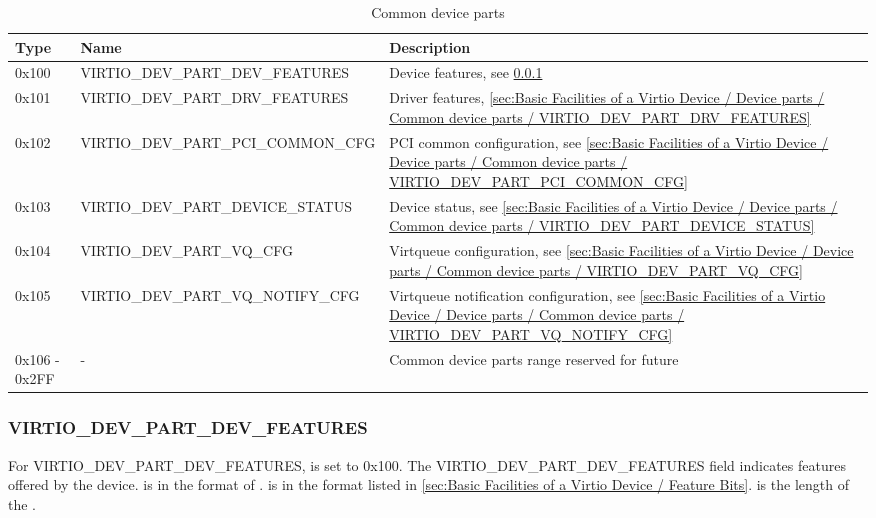 \begin{table}
\caption{Common device parts}
\label{table:Basic Facilities of a Virtio Device / Device parts / Common device parts}
\begin{tabularx}{\textwidth}{ |l||l|X| }
\hline
Type & Name & Description \\
\hline \hline
0x100 & VIRTIO_DEV_PART_DEV_FEATURES & Device features, see \ref{sec:Basic Facilities of a Virtio Device / Device parts / Common device parts / VIRTIO_DEV_PART_DEV_FEATURES} \\
\hline
0x101 & VIRTIO_DEV_PART_DRV_FEATURES & Driver features, \ref{sec:Basic Facilities of a Virtio Device / Device parts / Common device parts / VIRTIO_DEV_PART_DRV_FEATURES} \\
\hline
0x102 & VIRTIO_DEV_PART_PCI_COMMON_CFG & PCI common configuration, see \ref{sec:Basic Facilities of a Virtio Device / Device parts / Common device parts / VIRTIO_DEV_PART_PCI_COMMON_CFG} \\
\hline
0x103 & VIRTIO_DEV_PART_DEVICE_STATUS & Device status, see \ref{sec:Basic Facilities of a Virtio Device / Device parts / Common device parts / VIRTIO_DEV_PART_DEVICE_STATUS} \\
\hline
0x104 & VIRTIO_DEV_PART_VQ_CFG & Virtqueue configuration, see \ref{sec:Basic Facilities of a Virtio Device / Device parts / Common device parts / VIRTIO_DEV_PART_VQ_CFG} \\
\hline
0x105 & VIRTIO_DEV_PART_VQ_NOTIFY_CFG & Virtqueue notification configuration, see \ref{sec:Basic Facilities of a Virtio Device / Device parts / Common device parts / VIRTIO_DEV_PART_VQ_NOTIFY_CFG} \\
\hline
0x106 - 0x2FF & - & Common device parts range reserved for future \\
\hline
\hline
\end{tabularx}
\end{table}

\subsubsection{VIRTIO_DEV_PART_DEV_FEATURES}
\label{sec:Basic Facilities of a Virtio Device / Device parts / Common device parts / VIRTIO_DEV_PART_DEV_FEATURES}

For VIRTIO_DEV_PART_DEV_FEATURES,  is set to 0x100.
The VIRTIO_DEV_PART_DEV_FEATURES field indicates features offered by the device.
 is in the format of .
 is in the format listed in
\ref{sec:Basic Facilities of a Virtio Device / Feature Bits}.
 is the length of the .


